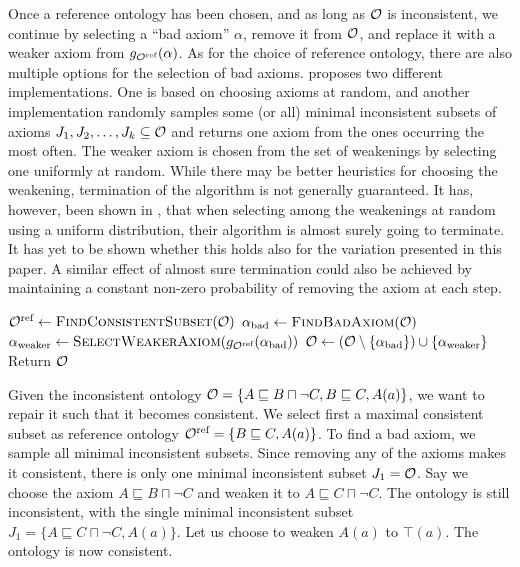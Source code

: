 Once a reference ontology has been chosen, and as long as $\mathcal{O}$ is inconsistent, we continue by selecting a ``bad axiom'' $\alpha$, remove it from $\mathcal{O}$, and replace it with a weaker axiom from $g_{\mathcal{O}^\textnormal{ref}}(\alpha)$. As for the choice of reference ontology, there are also multiple options for the selection of bad axioms. \cite{troquard2018repairing} proposes two different implementations. One is based on choosing axioms at random, and another implementation randomly samples some (or all) minimal inconsistent subsets of axioms $J_1, J_2, \dots, J_k \subseteq \mathcal{O}$ and returns one axiom from the ones occurring the most often. The weaker axiom is chosen from the set of weakenings by selecting one uniformly at random. While there may be better heuristics for choosing the weakening, termination of the algorithm is not generally guaranteed. It has, however, been shown in \cite{confalonieri2020towards}, that when selecting among the weakenings at random using a uniform distribution, their algorithm is almost surely going to terminate. It has yet to be shown whether this holds also for the variation presented in this paper. A similar effect of almost sure termination could also be achieved by maintaining a constant non-zero probability of removing the axiom at each step.

\begin{algorithm}[ht]
  \begin{algorithmic}
    \State ${\mathcal{O}^\textnormal{ref}} \gets \textsc{FindConsistentSubset}(\mathcal{O})$
      \State $\alpha_\textnormal{bad} \gets \textsc{FindBadAxiom}(\mathcal{O})$
      \State $\alpha_\textnormal{weaker} \gets \textsc{SelectWeakerAxiom}(g_{\mathcal{O}^\textnormal{ref}}(\alpha_\textnormal{bad}))$
      \State $\mathcal{O} \gets (\mathcal{O} \setminus \{\alpha_\textnormal{bad}\}) \cup \{\alpha_\textnormal{weaker}\}$
    \EndWhile
    \State Return $\mathcal{O}$
  \end{algorithmic}
  \caption{$\textsc{RepairOntologyWeaken}(\Omc)$}
  \label{algo:repair-weaken-alc}
\end{algorithm}

\begin{example}\label{ex:alc-weakening}
  Given the inconsistent ontology $\mathcal{O} = \{ A \sqsubseteq B \sqcap \lnot C, B \sqsubseteq C, A(a) \}$, we want to repair it such that it becomes consistent. We select first a maximal consistent subset as reference ontology ${\mathcal{O}^\textnormal{ref}} = \{ B \sqsubseteq C, A(a) \}$. To find a bad axiom, we sample all minimal inconsistent subsets. Since removing any of the axioms makes it consistent, there is only one minimal inconsistent subset $J_1 = \mathcal{O}$. Say we choose the axiom $A \sqsubseteq B \sqcap \lnot C$ and weaken it to $A \sqsubseteq C \sqcap \lnot C$. The ontology is still inconsistent, with the single minimal inconsistent subset $J_1 = \{ A \sqsubseteq C \sqcap \lnot C, A(a) \}$. Let us choose to weaken $A(a)$ to $\top(a)$. The ontology is now consistent.
\end{example}

